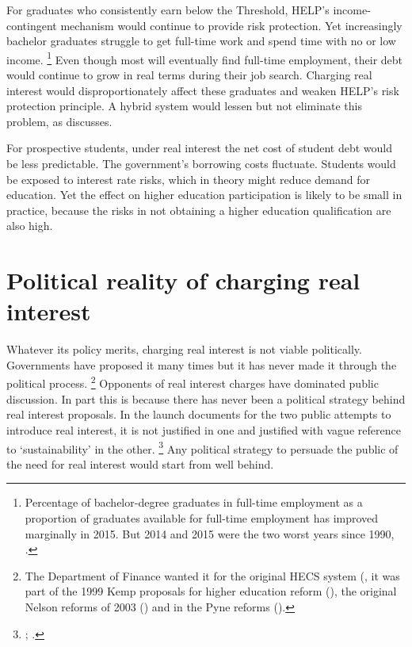 \documentclass{grattan}
\begin{document}
For graduates who consistently earn below the \gls{Threshold}, \gls{HELP}'s income-contingent mechanism would continue to provide risk protection.
Yet increasingly bachelor graduates struggle to get full-time work and spend time with no or low income.%
   \footnote{Percentage of bachelor-degree graduates in full-time employment as a proportion of graduates available for full-time employment has improved marginally in 2015.
But 2014 and 2015 were the two worst years since 1990, \textcite{GCAvariousyearsGradStatsemploymentsalary}.}
Even though most will eventually find full-time employment, their debt would continue to grow in real terms during their job search.
Charging real interest would disproportionately affect these graduates and weaken \gls{HELP}'s risk protection principle.
A hybrid system would lessen but not eliminate this problem, as  discusses.

For prospective students, under real interest the net cost of student debt would be less predictable.
The government's borrowing costs fluctuate.
Students would be exposed to interest rate risks, which in theory might reduce demand for education.
Yet the effect on higher education participation is likely to be small in practice, because the risks in not obtaining a higher education qualification are also high.

\section{Political reality of charging real interest}\label{political-reality-of-charging-real-interest}

Whatever its policy merits, charging real interest is not viable politically.
Governments have proposed it many times but it has never made it through the political process.%
   \footnote{The Department of Finance wanted it for the original \gls{HECS} system (\textcite{Archives19882015Cabinetsubmission5922}, it was part of the 1999 Kemp proposals for higher education reform (\textcite{Kemp2001Appendix4Leaked}), the original Nelson reforms of 2003 (\textcite{Nelson2003OuruniversitiesBacking}) and in the Pyne reforms (\textcite{Education2014Portfoliobudgetstatements}).} 
Opponents of real interest charges have dominated public discussion.
In part this is because there has never been a political strategy behind real interest proposals.
In the launch documents for the two public attempts to introduce real interest, it is not justified in one and justified with vague reference to `sustainability' in the other.%
   \footnote{\textcite{Nelson2003OuruniversitiesBacking}; \textcite{Education2014Portfoliobudgetstatements}.} 
Any political strategy to persuade the public of the need for real interest would start from well behind.
\end{document}
